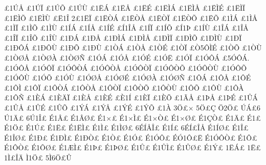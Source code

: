 {^^a31^^da^^c5
^^a31^^da^^cf
^^a31^^da^^d5
^^a31^^da^^d9
^^a31^^cb^^c1
^^a31^^cb^^c5
^^a31^^cb^^c9
^^a31^^cb^^cc^^c1
^^a31^^cb^^cc^^c5
^^a31^^cb^^cc^^c9
^^a31^^cb^^cc^^cf
^^a31^^cb^^cc^^d5
^^a31^^cb^^cc^^d9
^^a3^^cb1^^ce
2^^a31^^cb^^cf
^^a31^^cb^^d2^^c1
^^a31^^cb^^d2^^c5
^^a31^^cb^^d2^^cf
^^a31^^cb^^d2^^d5
^^a31^^cb^^d5
^^a31^^cc^^c1
^^a31^^cc^^c5
^^a31^^cc^^cf
^^a31^^cc^^d5
^^a31^^cc^^d9
^^a31^^cd^^c1
^^a31^^cd^^c5
^^a31^^cd^^c9
^^a3^^cd1^^ce^^c5
^^a31^^cd^^cf
^^a31^^cd^^d5
^^a3^^cd1^^de
^^a31^^cd^^d9
^^a31^^ce^^c1
^^a31^^ce^^c5
^^a31^^ce^^cf
^^a31^^ce^^d5
^^a31^^ce^^d9
^^a31^^d0^^c1
^^a31^^d0^^c5
^^a31^^d0^^cc^^c1
^^a31^^d0^^cc^^c5
^^a31^^d0^^cc^^cf
^^a31^^d0^^cc^^d5
^^a31^^d0^^cc^^d9
^^a31^^d0^^cf
^^a31^^d0^^d4^^c1
^^a31^^d0^^d4^^d9
^^a31^^d0^^d5
^^a31^^d0^^d9
^^a31^^d2^^c1
^^a31^^d2^^c5
^^a31^^d2^^c9
^^a31^^d2^^cf
^^a3^^d25^^d4^^cc^^c9
^^a31^^d2^^d5
^^a31^^d2^^d9
^^a31^^d2^^d8^^c5
^^a31^^d2^^d8^^c0
^^a31^^d2^^d8^^d1
^^a31^^d3^^c1
^^a31^^d3^^c5
^^a31^^d3^^c9
^^a31^^d3^^cb
^^a31^^d3^^cf
^^a31^^d3^^d4^^c1
^^a35^^d3^^d4^^c1.
^^a31^^d3^^d4^^c5
^^a31^^d3^^d4^^cf
^^a31^^d3^^d4^^d2^^c1
^^a31^^d3^^d4^^d2^^c5
^^a31^^d3^^d4^^d2^^cf
^^a31^^d3^^d4^^d2^^d5
^^a31^^d3^^d4^^d2^^d9
^^a31^^d3^^d4^^d5
^^a31^^d3^^d4^^d9
^^a31^^d3^^d5
^^a31^^d3^^d9
^^a31^^d3^^d8^^c5
^^a31^^d3^^d8^^c9
^^a31^^d3^^d8^^c0
^^a31^^d3^^d8^^d1
^^a31^^d4^^c1
^^a31^^d4^^c5
^^a31^^d4^^c9
^^a31^^d4^^cc
^^a31^^d4^^cf
^^a31^^d4^^d2^^c1
^^a31^^d4^^d2^^c5
^^a31^^d4^^d2^^cf
^^a31^^d4^^d2^^d5
^^a31^^d4^^d2^^d9
^^a31^^d4^^d5
^^a31^^d4^^d9
^^a31^^d4^^c0
^^a31^^d4^^d1
^^a31^^c8^^c1
^^a31^^c8^^c4^^cf
^^a31^^c8^^c5
^^a31^^c8^^c9
^^a3^^c81^^cd
^^a31^^c8^^cf
^^a31^^c8^^d5
^^a31^^c3^^c5
^^a31^^de^^c5
^^a31^^de^^c9
^^a31^^db^^c1
^^a31^^db^^c5
^^a31^^db^^c9
^^a31^^db^^d5
^^a31^^dd^^c1
^^a31^^dd^^c5
^^a31^^dd^^c9
^^a31^^dd^^d5
^^a31^^c0
3^^d6^^a3^^d7
5^^d6^^a3^^c7
^^d62^^d6^^a3
^^da^^c1^^a36
^^da1^^c4^^a3
6^^da1^^ce^^a3
^^c91^^c2^^a3
^^c91^^c2^^d8^^a3
^^c91^^d7^^a3
^^c91^^d7^^cc^^a3
^^c91^^d7^^d2^^a3
^^c91^^d7^^d8^^a3
^^c91^^c7^^d2^^a3
^^c91^^c4^^a3
^^c91^^a3
^^c91^^d6^^a3
^^c91^^da^^a3
^^c91^^cb^^a3
^^c91^^cb^^cc^^a3
^^c91^^cc^^a3
^^c91^^cc^^d8^^a3
6^^c9^^cd^^c5^^ce^^a3
^^c91^^cd^^a3
6^^c9^^cd^^a3^^ce^^c5
^^c91^^cd^^d8^^a3
^^c91^^ce^^a3
^^c91^^ce^^d8^^a3
^^c91^^d0^^a3
^^c91^^d0^^cc^^a3
^^c91^^d0^^d2^^a3
^^c91^^d2^^a3
^^c91^^d3^^a3
^^c91^^d3^^d4^^a3
^^c9^^d31^^d4^^a3^^cb
^^c91^^d3^^d4^^d2^^a3
^^c91^^d4^^a3
^^c91^^d4^^d2^^a3
^^c91^^d4^^d8^^a3
^^c91^^c6^^cc^^a3
^^c91^^de^^a3
^^c91^^de^^d8^^a3
^^c91^^db^^a3
^^c91^^db^^cc^^a3
^^c91^^db^^d8^^a3
^^c91^^dd^^a3
1^^cb^^c1^^a3
1^^cb^^a3
1^^cc^^a3^^ce^^c4
^^cc1^^d6^^a3
5^^cc6^^d6^^a3^^db
}
